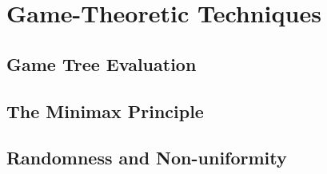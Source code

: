 \documentclass[a4paper]{article}
\begin{document}
\section{Game-Theoretic Techniques}
\subsection{Game Tree Evaluation}

\subsection{The Minimax Principle}
\subsection{Randomness and Non-uniformity}
\end{document}
